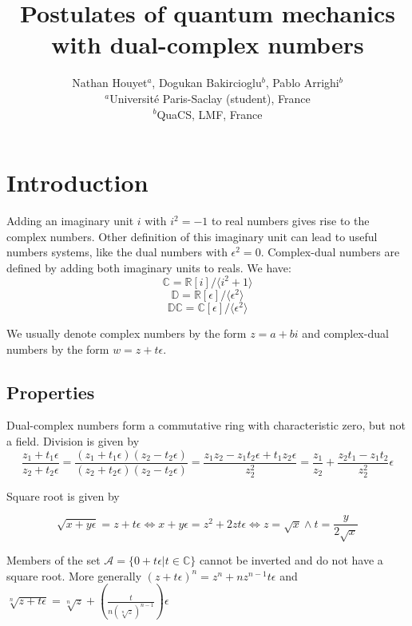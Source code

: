 \documentclass{article}
\title{Postulates of quantum mechanics with dual-complex numbers}
\author{Nathan Houyet$^{a}$, Dogukan Bakircioglu$^{b}$, Pablo Arrighi$^{b}$ \\
        \small $^{a}$Université Paris-Saclay (student), France \\
        \small $^{b}$QuaCS, LMF, France \\
}
\date{}
\newcommand{\R}{\mathbb{R}}
\newcommand{\C}{\mathbb{C}}
\newcommand{\D}{\mathbb{D}}
\newcommand{\DC}{\mathbb{DC}}
\newcommand{\A}{\mathcal{A}}
\newcommand{\e}{\epsilon}
\begin{document}
\maketitle

\section{Introduction}
\noindent Adding an imaginary unit $i$ with $i^2 = -1$ to real numbers gives rise to the complex numbers. Other definition of this imaginary unit can lead to useful numbers systems, like the dual numbers with $\e^2 = 0$. Complex-dual numbers are defined by adding both imaginary units to reals. We have: \\

\begin{equation}
\C = \R [i]/\langle i^2+1 \rangle
\end{equation}
\begin{equation}
\D = \R [\e]/\langle \e^2 \rangle
\end{equation}
\begin{equation}
\DC = \C [\e]/\langle \e^2 \rangle
\end{equation}

We usually denote complex numbers by the form $z = a + bi$ and complex-dual numbers by the form $w = z + t\e$.

\subsection{Properties}

Dual-complex numbers form a commutative ring with characteristic zero, but not a field. Division is given by
\begin{equation}
\frac{z_1 + t_1 \e}{z_2 + t_2 \e} = \frac{(z_1 + t_1 \e)(z_2 - t_2 \e)}{(z_2 + t_2 \e)(z_2 - t_2 \e)} = \frac{z_1 z_2 - z_1 t_2 \e + t_1 z_2 \e}{z_2^2} = \frac{z_1}{z_2} + \frac{z_2 t_1 - z_1 t_2 }{z_2^2} \e
\end{equation}

Square root is given by

\begin{equation}
\sqrt{x + y \e} = z + t \e \iff x + y \e = z^2 + 2 z t \e \iff z = \sqrt{x} \land t = \frac{y}{2 \sqrt{x}}
\end{equation}

Members of the set $\A = \{0 + t \e | t \in \C\}$ cannot be inverted and do not have a square root. More generally $(z + t\e)^n = z^n + n z^{n-1} t \e$ and $\sqrt[n]{z + t \e} = \sqrt[n]{z} + (\frac{t}{n(\sqrt[n]{z})^{n-1}}) \e$
\end{document}
